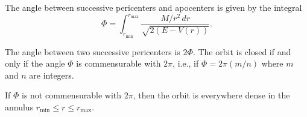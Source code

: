 The angle between successive pericenters and apocenters is given by the integral
$$\Phi = \int_{r_{\min}}^{r_{\max}} \frac{M/r^2 \, dr}{\sqrt{2(E - V(r))}}.$$

The angle between two successive pericenters is $2\Phi$. The orbit is closed if and only if the angle $\Phi$ is commensurable with $2\pi$, i.e., if $\Phi = 2\pi(m/n)$ where $m$ and $n$ are integers.

If $\Phi$ is not commensurable with $2\pi$, then the orbit is everywhere dense in the annulus $r_{\min} \leq r \leq r_{\max}$.
